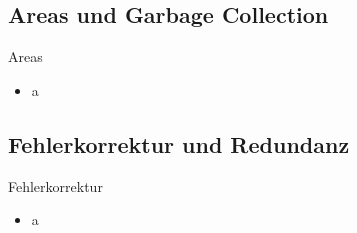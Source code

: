 \documentclass[
	,footlinenumber
	,navline=true
	,footlineauthor
	,ngerman
	]{beamer}
\begin{document}
\subsection{Areas und Garbage Collection}
\begin{frame}{Areas}
	\begin{block}{}
		\begin{itemize}
			\item a
		\end{itemize}
	\end{block}
\end{frame}

\subsection{Fehlerkorrektur und Redundanz}
\begin{frame}{Fehlerkorrektur}
	\begin{block}{}
		\begin{itemize}
			\item a
		\end{itemize}
	\end{block}
\end{frame}
\end{document}
